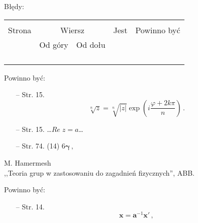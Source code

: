 \documentclass[a4paper,11pt]{article}
\begin{document}
Błędy:\\
\begin{tabular}{|c|c|c|c|c|}
  \hline
  & \multicolumn{2}{c|}{} & & \\
  Strona & \multicolumn{2}{c|}{Wiersz} & Jest
                            & Powinno być \\ \cline{2-3}
  & Od góry & Od dołu & & \\
  \hline
  & & & & \\
  & & & & \\
  & & & & \\
  & & & & \\
  \hline
\end{tabular}

Powinno być:
\begin{itemize}
\item[--] Str. 15.
  $$\sqrt[ n ]{ z } = \sqrt[ n ]{ | z | } \exp( i \frac{ \varphi + 2 k
    \pi }{ n } ) \, .$$
\item[--] Str. 15. \ldots $Re \; z = a$\ldots
\item[--] Str. 74. (14) $6 \boldsymbol{ \gamma } \, ,$
\end{itemize}



\begin{center}
  M. Hamermesh\\
  ,,Teoria grup w zastosowaniu do zagadnień fizycznych'', ABB.
\end{center}


Powinno być:
\begin{itemize}
\item[--] Str. 14.
  $$ \mathbf{ x } = \mathbf{ a }^{ -1 } \mathbf{ x }' \, ,$$
\end{itemize}





 {}



\end{document}

